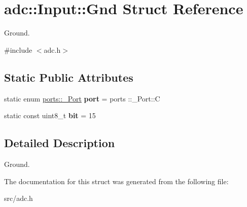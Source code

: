 \hypertarget{structadc_1_1Input_1_1Gnd}{}\section{adc\+:\+:Input\+:\+:Gnd Struct Reference}
\label{structadc_1_1Input_1_1Gnd}


Ground.  




{\ttfamily \#include $<$adc.\+h$>$}

\subsection*{Static Public Attributes}
\begin{DoxyCompactItemize}
\item 
static enum \hyperlink{namespaceports_a9949317f344930bd6ad1097e80c97b67}{ports\+::\+\_\+\+Port} {\bfseries port} = ports \+::\+\_\+\+Port\+::C\hypertarget{structadc_1_1Input_1_1Gnd_a1115375eb1ceecc4104601bff24bd253}{}\label{structadc_1_1Input_1_1Gnd_a1115375eb1ceecc4104601bff24bd253}

\item 
static const uint8\+\_\+t {\bfseries bit} = 15\hypertarget{structadc_1_1Input_1_1Gnd_ac4396959d7953db075098bb106a39deb}{}\label{structadc_1_1Input_1_1Gnd_ac4396959d7953db075098bb106a39deb}

\end{DoxyCompactItemize}


\subsection{Detailed Description}
Ground. 

The documentation for this struct was generated from the following file\+:\begin{DoxyCompactItemize}
\item 
src/adc.\+h\end{DoxyCompactItemize}
